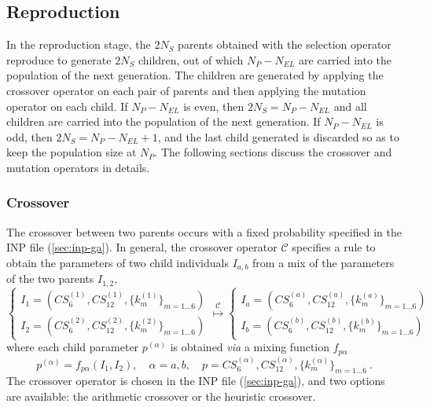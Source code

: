\documentclass[10pt,a4paper,openany]{memoir}
\numberwithin{equation}{section}
\begin{document}
\subsection{Reproduction}
\label{sec:ga-reproduction}

In the reproduction stage, the $2N_S$ parents obtained with the selection
operator reproduce to generate $2N_S$ children, out of which $N_P-N_{EL}$
are carried into the population of the next generation. The children are
generated by applying the crossover operator on each
pair of parents and then applying the mutation
operator on each child. If $N_P-N_{EL}$ is even, then $2N_S=N_P-N_{EL}$
and all children are carried into the population of the next generation. If
$N_P - N_{EL}$ is odd, then $2N_S=N_P-N_{EL}+1$, and the last child
generated is discarded so as to keep the population size at $N_P$.
The following sections discuss the crossover and mutation operators in details.

\subsubsection{Crossover}
\label{sec:ga-crossover}

The crossover between two parents occurs with a fixed probability
specified in the INP file (\autoref{sec:inp-ga}). In general, the
crossover operator $\mathcal{C}$ specifies a rule to obtain the
parameters of two child individuals $I_{a,b}$ from a mix of the
parameters of the two parents $I_{1,2}$,
\begin{equation}
  \label{eq:ga-crossover}
  \left\{
    \begin{array}{l}
      I_1 = (CS_6^{(1)},CS_{12}^{(1)},\{k_m^{(1)}\}_{m=1\ldots 6}) \\
      I_2 = (CS_6^{(2)},CS_{12}^{(2)},\{k_m^{(2)}\}_{m=1\ldots 6})
    \end{array}
  \right.
  \overset{\mathcal{C}}{\longmapsto}
    \left\{
    \begin{array}{l}
      I_a = (CS_6^{(a)},CS_{12}^{(a)},\{k_m^{(a)}\}_{m=1\ldots 6}) \\
      I_b = (CS_6^{(b)},CS_{12}^{(b)},\{k_m^{(b)}\}_{m=1\ldots 6})
    \end{array}
  \right.
\end{equation}
where each child parameter $p^{(\alpha)}$ is obtained \textit{via} a mixing function $f_{p\alpha}$
\begin{equation*}
  p^{(\alpha)} = f_{p\alpha}(I_1,I_2),\quad \alpha=a,b, \quad p = CS_6^{(\alpha)},CS_{12}^{(\alpha)},\{k_m^{(\alpha)}\}_{m=1\ldots 6}\ .
\end{equation*}
The crossover operator is chosen in the INP file
(\autoref{sec:inp-ga}), and two options are available: the arithmetic
crossover or the heuristic crossover.
\end{document}
